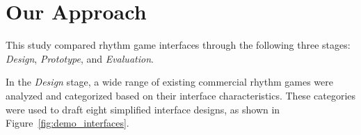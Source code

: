 \documentclass[annual]{acmsiggraph}
\begin{document}


\section{Our Approach}
\vspace{-6pt}
This study compared rhythm game interfaces through the following three stages: \textit{Design}, \textit{Prototype}, and \textit{Evaluation}.

In the \textit{Design} stage, a wide range of existing commercial rhythm games were analyzed and categorized based on their interface characteristics. These categories were used to draft eight simplified interface designs, as shown in Figure~\ref{fig:demo_interfaces}.
\end{document}
